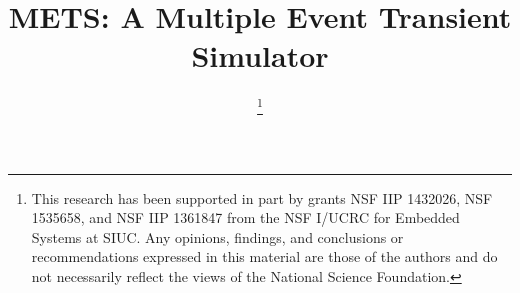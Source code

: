 \documentclass[conference]{IEEEtran}
\begin{document}
%

\title{METS: A Multiple Event Transient Simulator}

\author{
	\thanks{This research has been supported in part by grants NSF IIP 1432026, NSF 1535658,
		and NSF IIP 1361847 from the NSF I/UCRC for Embedded Systems at SIUC. 
		Any opinions, findings, and conclusions or recommendations expressed in this material are those of
		the authors and do not necessarily reflect the views of the National Science
		Foundation.
		}
}
\maketitle

\end{document}
